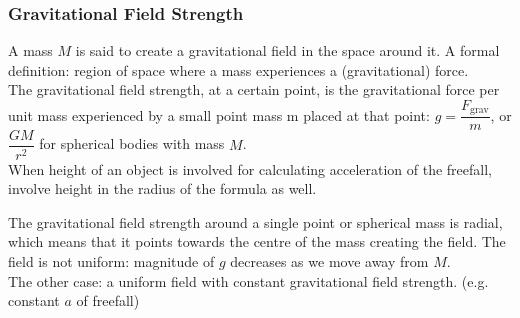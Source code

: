 \documentclass[a4paper,12pt]{article}
\begin{document}
\subsubsection*{Gravitational Field Strength}
A mass $M$ is said to create a gravitational field in the space around it. 
A formal definition: region of space where a mass experiences a (gravitational) force.\\
The gravitational field strength, at a certain point, is the gravitational force per unit mass experienced by a small point mass m placed at that point: $g=\dfrac{F_\text{grav}}{m}$, or $\dfrac{GM}{r^2}$ for spherical bodies with mass $M$.\\
When height of an object is involved for calculating acceleration of the freefall, involve height in the radius of the formula as well.
\begin{center}
\end{center}
The gravitational field strength around a single point or spherical mass is radial, which means that it points towards the centre of the mass creating the field. The field is not uniform: magnitude of $g$ decreases as we move away from $M$. \\
The other case: a uniform field with constant gravitational field strength. (e.g. constant $a$ of freefall)
\end{document}
